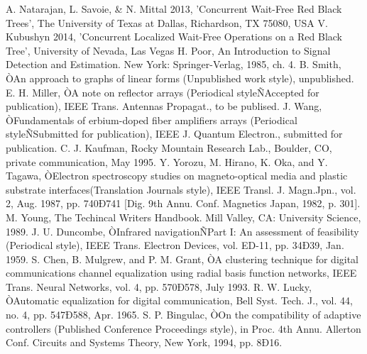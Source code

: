 \documentclass[letterpaper, 10 pt, conference]{ieeeconf}  %
\begin{document}
	\begin{thebibliography}{99}
		
		
		
		 A. Natarajan, L. Savoie, \& N. Mittal 2013, 'Concurrent Wait-Free Red Black Trees', The University of Texas at Dallas, Richardson, TX 75080, USA
		 V. Kubushyn 2014, 'Concurrent Localized Wait-Free Operations on a Red Black Tree', University of Nevada, Las Vegas
		 H. Poor, An Introduction to Signal Detection and Estimation.   New York: Springer-Verlag, 1985, ch. 4.
		 B. Smith, ÒAn approach to graphs of linear forms (Unpublished work style), unpublished.
		 E. H. Miller, ÒA note on reflector arrays (Periodical styleÑAccepted for publication), IEEE Trans. Antennas Propagat., to be publised.
		 J. Wang, ÒFundamentals of erbium-doped fiber amplifiers arrays (Periodical styleÑSubmitted for publication), IEEE J. Quantum Electron., submitted for publication.
		 C. J. Kaufman, Rocky Mountain Research Lab., Boulder, CO, private communication, May 1995.
		 Y. Yorozu, M. Hirano, K. Oka, and Y. Tagawa, ÒElectron spectroscopy studies on magneto-optical media and plastic substrate interfaces(Translation Journals style), IEEE Transl. J. Magn.Jpn., vol. 2, Aug. 1987, pp. 740Ð741 [Dig. 9th Annu. Conf. Magnetics Japan, 1982, p. 301].
		 M. Young, The Techincal Writers Handbook.  Mill Valley, CA: University Science, 1989.
		 J. U. Duncombe, ÒInfrared navigationÑPart I: An assessment of feasibility (Periodical style), IEEE Trans. Electron Devices, vol. ED-11, pp. 34Ð39, Jan. 1959.
		 S. Chen, B. Mulgrew, and P. M. Grant, ÒA clustering technique for digital communications channel equalization using radial basis function networks, IEEE Trans. Neural Networks, vol. 4, pp. 570Ð578, July 1993.
		 R. W. Lucky, ÒAutomatic equalization for digital communication, Bell Syst. Tech. J., vol. 44, no. 4, pp. 547Ð588, Apr. 1965.
		 S. P. Bingulac, ÒOn the compatibility of adaptive controllers (Published Conference Proceedings style), in Proc. 4th Annu. Allerton Conf. Circuits and Systems Theory, New York, 1994, pp. 8Ð16.

\end{thebibliography}
\end{document}
